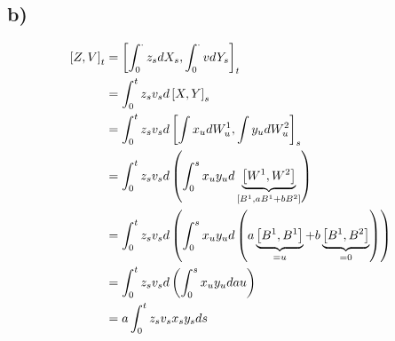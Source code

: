 \documentclass[document.tex]{subfiles}
\begin{document}
\subsection*{b)}

\begin{align*}
	\left[Z , V \right]_t &= \left[\int_0^\cdot z_s dX_s , \int_0^\cdot v dY_s \right]_t\\
&= \int_0^t z_s v_s d \left[X , Y \right]_s\\
&= \int_0^t z_s v_s d \left[\int x_u dW^1_u , \int y_u dW^2_u \right]_s\\
&= \int_0^t z_s v_s d \left( \int_0^s x_u y_u d \underbrace{\left[W^1 , W^2 \right]}
_{\left[B^1 , aB^1+bB^2 \right]} \right) \\ 
&= \int_0^t z_s v_s d \left( \int_0^s x_u y_u d \left( a \underbrace{\left[B^1 , B^1 \right]}_{=u} 
+b \underbrace{\left[B^1 , B^2 \right]}_{=0} \right) \right) \\
&= \int_0^t z_s v_s d \left( \int_0^s x_u y_u d a u \right) \\
&= a \int_0^t z_s v_s  x_s y_s d s 
\end{align*}
\end{document}
